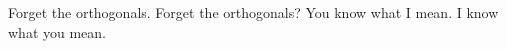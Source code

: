 

Forget the orthogonals.  Forget the orthogonals?  You know what I
mean.  I know what you mean.

\bye

